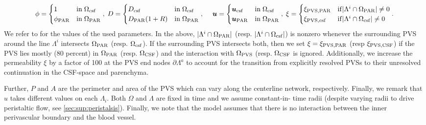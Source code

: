 \documentclass[fleqn,10pt]{wlscirep}
\newcommand{\rami}[1]{\textcolor{blue}{#1}}
\newcommand{\mer}[1]{\textcolor{magenta}{#1}}
\begin{document}
\[
\phi =  \begin{cases}
    1  & \mathrm{in} \;  \Omega_{\rm{csf}} \\ 
    \phi_{\rm{PAR}} & \mathrm{in} \; \Omega_{\rm{PAR}} 
    \end{cases}, \; 
 D= \begin{cases}
    D_{\rm{csf}} & \mathrm{in} \;  \Omega_{\rm{csf}} \\ 
    D_{\rm{PAR}} (1+ R) & \mathrm{in} \; \Omega_{\rm{PAR}} \end{cases}, \; 
    \quad \bm u  = \begin{cases}
    \bm{u}_{\rm{csf}} & \mathrm{in} \; \Omega_{\rm{csf}} \\ 
    \bm{u}_{\rm{PAR}} & \mathrm{in} \; \Omega_{\rm{PAR}} 
\end{cases}, \; 
\xi = \begin{cases}
 \xi_{\rm{PVS}, \rm{PAR}} & \mathrm{if} |\Lambda^i \cap \Omega_{\rm{PAR}}| \neq 0 \\ 
  \xi_{\rm{PVS}, \rm{csf}} & \mathrm{if} |\Lambda^i \cap \Omega_{\rm{csf}}| \neq 0
\end{cases} . 
\]
We refer to  for the values of the used parameters.
In the above,  $|\Lambda^i \cap \Omega_{\rm{PAR}}|$ (resp.  $|\Lambda^i \cap \Omega_{\rm{csf}}|$) is nonzero whenever the surrounding PVS around the line $\Lambda^i$ intersects $\Omega_{\rm{PAR}}$ (resp. $\Omega_{\rm{csf}}$). If the surrounding PVS intersects both, then we set $\xi = \xi_{\mathrm{PVS}, \rm{PAR}}$ (resp $\xi_{\mathrm{PVS}, \rm{CSF}}$) if the PVS lies mostly ($80$ percent) in $\Omega_{\rm{PAR}}$ (resp. $\Omega_{\rm{CSF}}$) and the interaction with $\Omega_{\rm{PVS}}$ (resp. $\Omega_{\rm{CSF}}$ is ignored. Additionally, we increase the permeability $\xi$ by a factor of 100 at the PVS end nodes $\partial \Lambda^a$ to account for the transition from explicitly resolved PVSs to their unresolved continuation in the CSF-space and parenchyma.

Further, $P$ and $A$ are the perimeter and area of the PVS which can vary along the centerline network, respectively.  Finally, we remark that $\hat u$ takes different values on each $\Lambda_i$.  Both $\Omega$ and $\Lambda$ are fixed in time and we assume constant-in- time radii (despite varying radii to drive peristaltic flow, see \cref{sec:sup:peristalsis}). Finally, we note that the model assumes that there is no interaction between the inner perivascular boundary and the blood vessel. 

\end{document}
